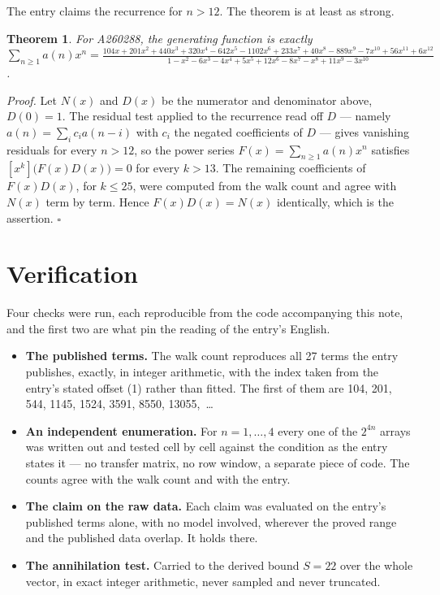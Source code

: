 \documentclass[11pt]{article}
\newtheorem{theorem}{Theorem}
\theoremstyle{definition}
\begin{document}
The entry claims the recurrence for $n > 12$. The theorem is at least as strong.

\begin{theorem} For A260288, the generating function is exactly $\sum_{n\ge 1} a(n)x^n = \frac{104x + 201x^{2} + 440x^{3} + 320x^{4} - 642x^{5} - 1102x^{6} + 233x^{7} + 40x^{8} - 889x^{9} - 7x^{10} + 56x^{11} + 6x^{12}}{1 - x^{2} - 6x^{3} - 4x^{4} + 5x^{5} + 12x^{6} - 8x^{7} - x^{8} + 11x^{9} - 3x^{10}}$.\end{theorem}

{\itshape Proof.} Let $N(x)$ and $D(x)$ be the numerator and denominator above, $D(0)=1$. The residual test applied to the recurrence read off $D$ --- namely $a(n) = \sum_i c_i a(n-i)$ with $c_i$ the negated coefficients of $D$ --- gives vanishing residuals for every $n > 12$, so the power series $F(x)=\sum_{n\ge 1}a(n)x^n$ satisfies $[x^k]\bigl(F(x)D(x)\bigr) = 0$ for every $k > 13$. The remaining coefficients of $F(x)D(x)$, for $k \le 25$, were computed from the walk count and agree with $N(x)$ term by term. Hence $F(x)D(x) = N(x)$ identically, which is the assertion. $\square$

\section{Verification}

Four checks were run, each reproducible from the code accompanying this note, and the first two are what pin the reading of the entry's English.

\begin{itemize}

\item {\bfseries The published terms.} The walk count reproduces all 27 terms the entry publishes, exactly, in integer arithmetic, with the index taken from the entry's stated offset (1) rather than fitted. The first of them are 104, 201, 544, 1145, 1524, 3591, 8550, 13055,~\dots

\item {\bfseries An independent enumeration.} For $n = 1,\dots,4$ every one of the $2^{4n}$ arrays was written out and tested cell by cell against the condition as the entry states it --- no transfer matrix, no row window, a separate piece of code. The counts agree with the walk count and with the entry.

\item {\bfseries The claim on the raw data.} Each claim was evaluated on the entry's published terms alone, with no model involved, wherever the proved range and the published data overlap. It holds there.

\item {\bfseries The annihilation test.} Carried to the derived bound $S = 22$ over the whole vector, in exact integer arithmetic, never sampled and never truncated.

\end{itemize}
\end{document}
